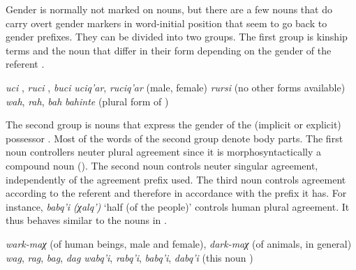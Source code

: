 Gender is normally not marked on nouns, but there are a few nouns that do carry overt gender markers in word-initial position that seem to go back to gender prefixes. They can be divided into two groups. The first group is kinship terms and the noun  that differ in their form depending on the gender of the referent . 
%
\begin{exe}
	\ex	\label{ex:nounsovertgendermarkers}
	\begin{xlist}
		\ex	\textit{uc{\lmk}i} , \textit{ruc{\lmk}i} , \textit{buc{\lmk}i} 
		\ex	\textit{uc{\lmk}iq'ar}, \textit{ruc{\lmk}iq'ar}  (male, female)
		\ex	\textit{rurs{\lmk}i}  (no other forms available)
		\ex	\textit{wah}, \textit{rah}, \textit{bah} 
		\ex	\textit{bahinte}  (plural form of )
	\end{xlist}
	\end{exe}
	
The second group is nouns that express the gender of the (implicit or explicit) possessor . Most of the words of the second group denote body parts. The first noun controllers neuter plural agreement since it is morphosyntactically a compound noun (). The second noun controls neuter singular agreement, independently of the agreement prefix used. The third noun controls agreement according to the referent and therefore in accordance with the prefix it has. For instance, \textit{babq'i (χalq')} `half (of the people)' controls human plural agreement. It thus behaves similar to the nouns in .
	
\begin{exe}	
		\ex	\label{ex:nounsovertgendermarkers2}
	\begin{xlist}
		\ex	\textit{wark-maχ}  (of human beings, male and female), \textit{dark-maχ}  (of animals, in general) 
		\ex	\textit{wag}, \textit{rag},\textit{ bag}, \textit{dag} \sqt{middle, waist}
		\ex	\textit{wabq'i},\textit{ rabq'i}, \textit{babq'i},\textit{ dabq'i}  (this noun )
	\end{xlist}
\end{exe}

